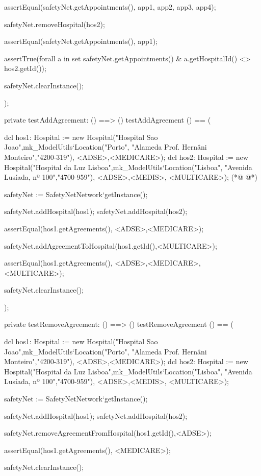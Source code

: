 \begin{vdmpp}[breaklines=true]
  assertEqual(safetyNet.getAppointments(), {app1, app2, app3, app4}); 
  
  safetyNet.removeHospital(hos2);
  
  assertEqual(safetyNet.getAppointments(), {app1});
  
  assertTrue(forall a in set safetyNet.getAppointments() & a.getHospitalId() <> hos2.getId()); 
  
  safetyNet.clearInstance();
    
);

private testAddAgreement: () ==> ()
 testAddAgreement () == (
  
  dcl hos1: Hospital := new Hospital("Hospital Sao Joao",mk_ModelUtils`Location("Porto", "Alameda Prof. Hernâni Monteiro","4200-319"), {<ADSE>,<MEDICARE>});
  dcl hos2: Hospital := new Hospital("Hospital da Luz Lisboa",mk_ModelUtils`Location("Lisboa", "Avenida Lusíada, nº 100","4700-959"), {<ADSE>,<MEDIS>, <MULTICARE>});
(*@
\label{testGetSpecialtyAppointments:850}
@*)
  
  safetyNet := SafetyNetNetwork`getInstance();
   
  safetyNet.addHospital(hos1);
  safetyNet.addHospital(hos2);
  
  assertEqual(hos1.getAgreements(), {<ADSE>,<MEDICARE>});
  
  safetyNet.addAgreementToHospital(hos1.getId(),<MULTICARE>);
  
  assertEqual(hos1.getAgreements(), {<ADSE>,<MEDICARE>, <MULTICARE>});
  
  safetyNet.clearInstance();
    
);

private testRemoveAgreement: () ==> ()
 testRemoveAgreement () == (
  
  dcl hos1: Hospital := new Hospital("Hospital Sao Joao",mk_ModelUtils`Location("Porto", "Alameda Prof. Hernâni Monteiro","4200-319"), {<ADSE>,<MEDICARE>});
  dcl hos2: Hospital := new Hospital("Hospital da Luz Lisboa",mk_ModelUtils`Location("Lisboa", "Avenida Lusíada, nº 100","4700-959"), {<ADSE>,<MEDIS>, <MULTICARE>});
  
  safetyNet := SafetyNetNetwork`getInstance();
   
  safetyNet.addHospital(hos1);
  safetyNet.addHospital(hos2);
  
  safetyNet.removeAgreementFromHospital(hos1.getId(),<ADSE>);
  
  assertEqual(hos1.getAgreements(), {<MEDICARE>});
  
  safetyNet.clearInstance();
    

\end{vdmpp}

